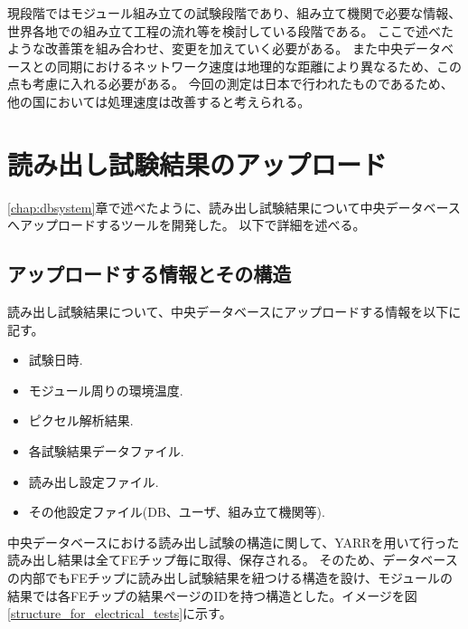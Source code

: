 現段階ではモジュール組み立ての試験段階であり、組み立て機関で必要な情報、世界各地での組み立て工程の流れ等を検討している段階である。
ここで述べたような改善策を組み合わせ、変更を加えていく必要がある。
また中央データベースとの同期におけるネットワーク速度は地理的な距離により異なるため、この点も考慮に入れる必要がある。
今回の測定は日本で行われたものであるため、他の国においては処理速度は改善すると考えられる。


\clearpage
\section{読み出し試験結果のアップロード}
\ref{chap:dbsystem}章で述べたように、読み出し試験結果について中央データベースへアップロードするツールを開発した。
以下で詳細を述べる。
\subsection{アップロードする情報とその構造}
読み出し試験結果について、中央データベースにアップロードする情報を以下に記す。
\begin{itemize}
  \item 試験日時.
  \item モジュール周りの環境温度.
  \item ピクセル解析結果.
  \item 各試験結果データファイル.
  \item 読み出し設定ファイル.
  \item その他設定ファイル(DB、ユーザ、組み立て機関等).
\end{itemize}

中央データベースにおける読み出し試験の構造に関して、YARRを用いて行った読み出し結果は全てFEチップ毎に取得、保存される。
そのため、データベースの内部でもFEチップに読み出し試験結果を紐つける構造を設け、モジュールの結果では各FEチップの結果ページのIDを持つ構造とした。イメージを図\ref{structure_for_electrical_tests}に示す。

